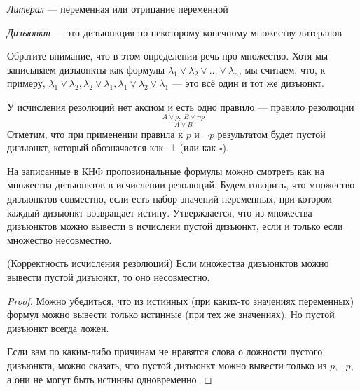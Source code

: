 \documentclass{article}
\begin{document}
\begin{definition} \textit{Литерал} --- переменная или отрицание переменной \end{definition}
\begin{definition} \textit{Дизъюнкт} --- это дизъюнкция по некоторому конечному множеству литералов \end{definition}

Обратите внимание, что в этом определении речь про множество. Хотя мы записываем дизъюнкты как формулы \(\lambda_1 \lor \lambda_2 \lor \ldots \lor \lambda_n\), мы считаем, что, к примеру, \(\lambda_1 \lor \lambda_2, \lambda_2 \lor \lambda_1, \lambda_1 \lor \lambda_2 \lor \lambda_1\) --- это всё один и тот же дизъюнкт.

У исчисления резолюций нет аксиом и есть одно правило --- правило резолюции
\[\tfrac{A \lor p, \; B \lor \lnot p}{A \lor B} \]
Отметим, что при применении правила к \(p\) и \(\lnot p\) результатом будет пустой дизъюнкт, который обозначается как \(\perp\)(или как \(\square\)).

На записанные в КНФ пропозиональные формулы можно смотреть как на множества дизъюнктов в исчислении резолюций. Будем говорить, что множество дизъюнктов совместно, если есть набор значений переменных, при котором каждый дизъюнкт возвращает истину. Утверждается, что из множества дизъюнктов можно вывести в исчислени пустой дизъюнкт, если и только если множество несовместно.

\begin{theorem}{(Корректность исчисления резолюций)}
	Если множества дизъюнктов можно вывести пустой дизъюнкт, то оно несовместно.
\end{theorem}
\begin{proof}
	Можно убедиться, что из истинных (при каких-то значениях переменных) формул можно вывести только истинные (при тех же значениях). Но пустой дизъюнкт всегда ложен.

	Если вам по каким-либо причинам не нравятся слова о ложности пустого дизъюнкта, можно сказать, что пустой дизъюнкт можно вывести только из \(p, \lnot p\), а они не могут быть истинны одновременно.
\end{proof}
\end{document}
